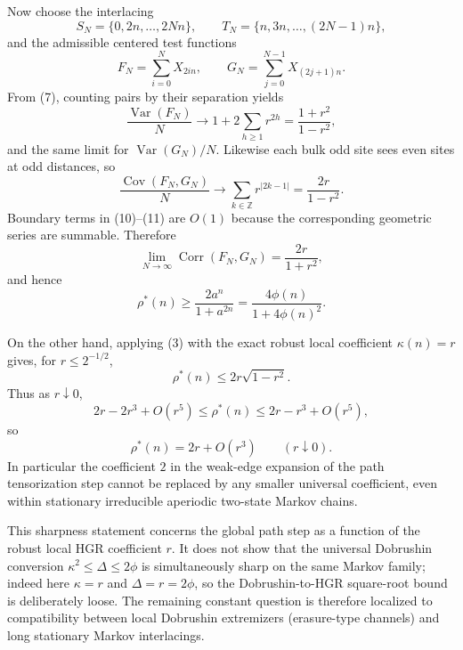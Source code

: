 Now choose the interlacing
\[
 S_N=\{0,2n,\ldots,2Nn\},\qquad
 T_N=\{n,3n,\ldots,(2N-1)n\},
\]
and the admissible centered test functions
\[
 F_N=\sum_{i=0}^{N}X_{2in},\qquad
 G_N=\sum_{j=0}^{N-1}X_{(2j+1)n}.
\]
From (7), counting pairs by their separation yields
\[
 \frac{\operatorname{Var}(F_N)}{N}
 \longrightarrow 1+2\sum_{h\ge1}r^{2h}
 =\frac{1+r^2}{1-r^2},
\tag{10}
\]
and the same limit for $\operatorname{Var}(G_N)/N$.  Likewise each bulk odd
site sees even sites at odd distances, so
\[
 \frac{\operatorname{Cov}(F_N,G_N)}{N}
 \longrightarrow \sum_{k\in\mathbb Z}r^{|2k-1|}
 =\frac{2r}{1-r^2}.
\tag{11}
\]
Boundary terms in (10)--(11) are $O(1)$ because the corresponding geometric
series are summable.  Therefore
\[
 \lim_{N\to\infty}\operatorname{Corr}(F_N,G_N)
 =\boxed{\frac{2r}{1+r^2}},
\tag{12}
\]
and hence
\[
 \boxed{\rho^*(n)\ge\frac{2a^n}{1+a^{2n}}
       =\frac{4\phi(n)}{1+4\phi(n)^2}.}
\tag{13}
\]

On the other hand, applying (3) with the exact robust local coefficient
$\kappa(n)=r$ gives, for $r\le2^{-1/2}$,
\[
 \rho^*(n)\le2r\sqrt{1-r^2}.
\tag{14}
\]
Thus as $r\downarrow0$,
\[
 2r-2r^3+O(r^5)
 \le \rho^*(n)
 \le 2r-r^3+O(r^5),
\]
so
\[
 \boxed{\rho^*(n)=2r+O(r^3)}
 \qquad(r\downarrow0).
\tag{15}
\]
In particular the coefficient $2$ in the weak-edge expansion of the path
tensorization step cannot be replaced by any smaller universal coefficient,
even within stationary irreducible aperiodic two-state Markov chains.

This sharpness statement concerns the global path step as a function of the
robust local HGR coefficient $r$.  It does not show that the universal
Dobrushin conversion $\kappa^2\le\Delta\le2\phi$ is simultaneously sharp on
the same Markov family; indeed here $\kappa=r$ and $\Delta=r=2\phi$, so the
Dobrushin-to-HGR square-root bound is deliberately loose.  The remaining
constant question is therefore localized to compatibility between local
Dobrushin extremizers (erasure-type channels) and long stationary Markov
interlacings.
